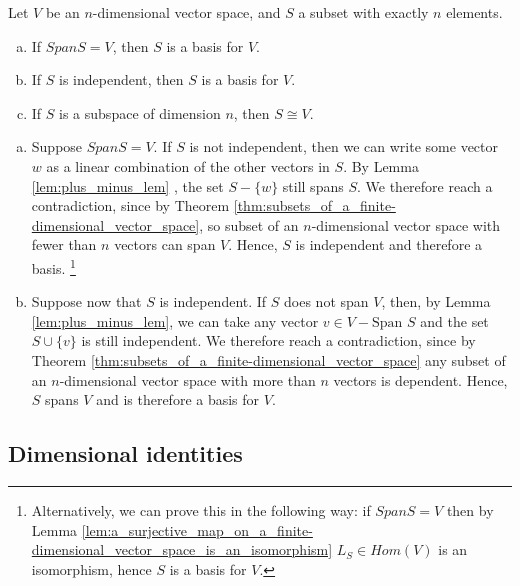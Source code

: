 \documentclass[12pt,letterpaper,reqno]{article}
\numberwithin{equation}{section}
\newcommand{\fixme}[1]{{\color{orange}{[#1]}}}
\begin{document}
\begin{thm}\label{thm:subsets_with_dim_V_elements}
Let $V$ be an $n$-dimensional vector space, and $S$ a subset with exactly $n$ elements.
\begin{enumerate}[(a)]
	\item If $Span S=V$, then $S$ is a basis for $V$.
	\item If $S$ is independent, then $S$ is a basis for $V$.
	\item If $S$ is a subspace of dimension $n$, then $S\cong V$.
\end{enumerate}	
\end{thm}

\begin{pf}
	\begin{enumerate}[(a)]
		\item Suppose $Span S=V$. If $S$ is not independent, then we can write some vector $w$ as a linear combination of the other vectors in $S$. By Lemma \ref{lem:plus_minus_lem} \fixme{Need to add this as part (b). See page 394 of Anton, Theorem 4.5.3. (Plus/Minus Theorem)}, the set $S-\{w\}$ still spans $S$. We therefore reach a contradiction, since by Theorem \ref{thm:subsets_of_a_finite-dimensional_vector_space}, so subset of an $n$-dimensional vector space with fewer than $n$ vectors can span $V$. Hence, $S$ is independent and therefore a basis. \footnote{Alternatively, we can prove this in the following way: if $Span S=V$ then by Lemma \ref{lem:a_surjective_map_on_a_finite-dimensional_vector_space_is_an_isomorphism}  $L_S \in Hom(V)$ is an isomorphism, hence $S$ is a basis for $V$. \fixme{Similar lemma for part (b)?}}
		\item Suppose now that $S$ is independent. If $S$ does not span $V$, then, by Lemma \ref{lem:plus_minus_lem}, we can take any vector $v \in V-\text{Span }S$ and the set $S \cup \{v\}$ is still independent. We therefore reach a contradiction, since by Theorem \ref{thm:subsets_of_a_finite-dimensional_vector_space} any subset of an $n$-dimensional vector space with more than $n$ vectors is dependent. Hence, $S$ spans $V$ and is therefore a basis for $V$.
	\end{enumerate}
\end{pf}

\subsection{Dimensional identities}
\fixme{Need to add a section on this.}
\end{document}
